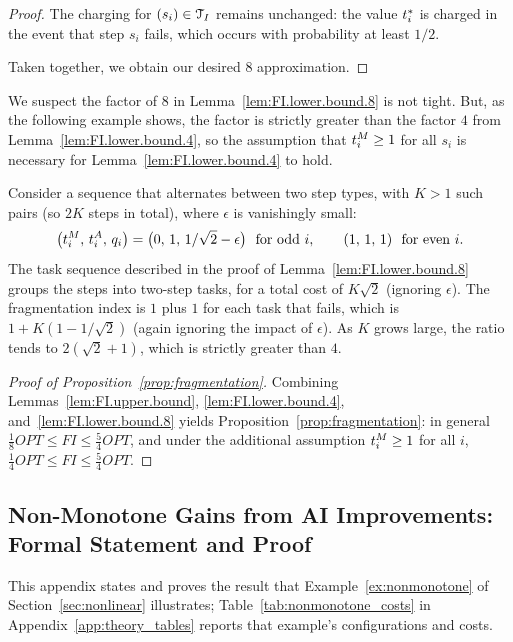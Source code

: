 \begin{proof}
    The charging for $(s_i) \in \mathcal{T}_I$ remains unchanged: the value $t^*_{i}$ is charged in the event that step $s_i$ fails, which occurs with probability at least $1/2$.

    Taken together, we obtain our desired $8$ approximation.
\end{proof}

We suspect the factor of $8$ in Lemma~\ref{lem:FI.lower.bound.8} is not tight.
But, as the following example shows, the factor is strictly greater than the factor $4$ from Lemma~\ref{lem:FI.lower.bound.4}, so the assumption that $t^{M}_{i} \geq 1$ for all $s_i$ is necessary for Lemma~\ref{lem:FI.lower.bound.4} to hold.

\begin{example}
\label{ex:FI.necessity}
Consider a sequence that alternates between two step types, with $K > 1$ such pairs (so $2K$ steps in total), where $\epsilon$ is vanishingly small:
\[ \bigl(t^{M}_{i},\, t^{A}_{i},\, q_i\bigr) = \bigl(0,\, 1,\, 1/\sqrt{2}-\epsilon\bigr) \ \text{ for odd $i$}, \qquad (1,\,1,\,1) \ \text{ for even $i$}. \]
The task sequence described in the proof of Lemma~\ref{lem:FI.lower.bound.8} groups the steps into two-step tasks, for a total cost of $K \sqrt{2}$ (ignoring $\epsilon$).
The fragmentation index is $1$ plus $1$ for each task that fails, which is $1 + K(1 - 1/\sqrt{2})$ (again ignoring the impact of $\epsilon$).
As $K$ grows large, the ratio tends to $2(\sqrt{2}+1)$, which is strictly greater than $4$.
\end{example}

\begin{proof}[Proof of Proposition~\ref{prop:fragmentation}]
Combining Lemmas~\ref{lem:FI.upper.bound}, \ref{lem:FI.lower.bound.4}, and~\ref{lem:FI.lower.bound.8} yields Proposition~\ref{prop:fragmentation}: in general $\tfrac{1}{8}OPT \leq FI \leq \tfrac{5}{4}OPT$, and under the additional assumption $t^{M}_{i} \geq 1$ for all $i$, $\tfrac{1}{4}OPT \leq FI \leq \tfrac{5}{4}OPT$.
\end{proof}

\subsection{Non-Monotone Gains from AI Improvements: Formal Statement and Proof}
\label{app:nonmonotone}

This appendix states and proves the result that Example~\ref{ex:nonmonotone} of Section~\ref{sec:nonlinear} illustrates; Table~\ref{tab:nonmonotone_costs} in Appendix~\ref{app:theory_tables} reports that example's configurations and costs.

